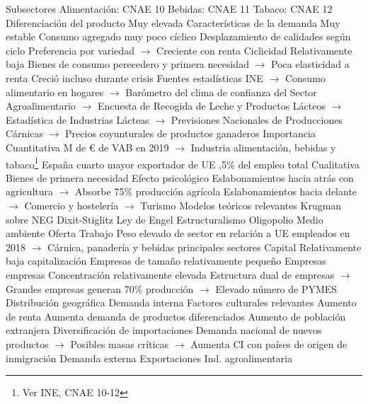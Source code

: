 \documentclass{nuevotema}
\begin{document}
\begin{esquemal}
				\4 Subsectores
				\4[] Alimentación: CNAE 10
				\4[] Bebidas: CNAE 11
				\4[] Tabaco: CNAE 12
				\4 Diferenciación del producto
				\4[] Muy elevada
				\4 Características de la demanda
				\4[] Muy estable
				\4[] Consumo agregado muy poco cíclico
				\4[] Desplazamiento de calidades según ciclo
				\4[] Preferencia por variedad
				\4[] $\to$ Creciente con renta
				\4 Ciclicidad
				\4[] Relativamente baja
				\4[] Bienes de consumo perecedero y primera necesidad
				\4[] $\to$ Poca elasticidad a renta
				\4[] Creció incluso durante crisis
				\4 Fuentes estadísticas
				\4[] INE
				\4[] $\to$ Consumo alimentario en hogares
				\4[] $\to$ Barómetro del clima de confianza del Sector Agroalimentario
				\4[] $\to$ Encuesta de Recogida de Leche y Productos Lácteos
				\4[] $\to$ Estadística de Industrias Lácteas
				\4[] $\to$ Previsiones Nacionales de Producciones Cárnicas
				\4[] $\to$ Precios coyunturales de productos ganaderos
			\3 Importancia
				\4 Cuantitativa
				 M de € de VAB en 2019
				\4[] $\to$ Industria alimentación, bebidas y tabaco\footnote{Ver INE, CNAE 10-12}
				\4[] España cuarto mayor exportador de UE
				,5\% del empleo total
				\4 Cualitativa
				\4[] Bienes de primera necesidad
				\4[] Efecto psicológico
				\4[] Eslabonamientos hacia atrás con agricultura
				\4[] $\to$ Absorbe 75\% producción agrícola
				\4[] Eslabonamientos hacia delante
				\4[] $\to$ Comercio y hostelería
				\4[] $\to$ Turismo
			\3 Modelos teóricos relevantes
				\4 Krugman sobre NEG
				\4 Dixit-Stiglitz
				\4 Ley de Engel
				\4 Estructuralismo
				\4 Oligopolio
				\4 Medio ambiente
			\3 Oferta
				\4 Trabajo
				\4[] Peso elevado de sector en relación a UE
				 empleados en 2018
				\4[] $\to$ Cárnica, panadería y bebidas principales sectores
				\4 Capital
				\4[] Relativamente baja capitalización
				\4[] Empresas de tamaño relativamente pequeño
				\4 Empresas
				 empresas
				\4[] Concentración relativamente elevada
				\4[] Estructura dual de empresas
				\4[] $\to$ Grandes empresas generan 70\% producción
				\4[] $\to$ Elevado número de PYMES
				\4 Distribución geográfica
			\3 Demanda interna
				\4 Factores culturales relevantes
				\4 Aumento de renta
				\4[] Aumenta demanda de productos diferenciados
				\4 Aumento de población extranjera
				\4[] Diversificación de importaciones
				\4[] Demanda nacional de nuevos productos
				\4[] $\to$ Posibles masas críticas
				\4[] $\to$ Aumenta CI con países de origen de inmigración
			\3 Demanda externa
				\4 Exportaciones
				\4[] Ind. agroalimentaria

\end{esquemal}
\end{document}

